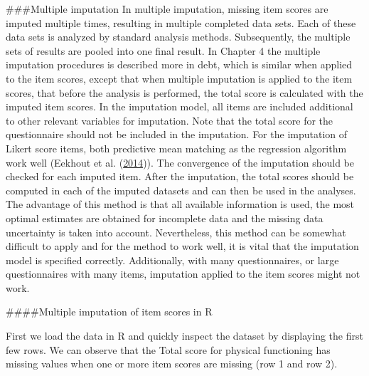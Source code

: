 \documentclass[
]{book}
\newenvironment{Shaded}{\begin{snugshade}}{\end{snugshade}}
\newcommand{\DecValTok}[1]{\textcolor[rgb]{0.00,0.00,0.81}{#1}}
\newcommand{\KeywordTok}[1]{\textcolor[rgb]{0.13,0.29,0.53}{\textbf{#1}}}
\newcommand{\NormalTok}[1]{#1}
\newcommand{\OperatorTok}[1]{\textcolor[rgb]{0.81,0.36,0.00}{\textbf{#1}}}
\newcommand{\OtherTok}[1]{\textcolor[rgb]{0.56,0.35,0.01}{#1}}
\newcommand{\StringTok}[1]{\textcolor[rgb]{0.31,0.60,0.02}{#1}}
\begin{document}
\#\#\#Multiple imputation In multiple imputation, missing item scores
are imputed multiple times, resulting in multiple completed data sets.
Each of these data sets is analyzed by standard analysis methods.
Subsequently, the multiple sets of results are pooled into one final
result. In Chapter 4 the multiple imputation procedures is described
more in debt, which is similar when applied to the item scores, except
that when multiple imputation is applied to the item scores, that before
the analysis is performed, the total score is calculated with the
imputed item scores. In the imputation model, all items are included
additional to other relevant variables for imputation. Note that the
total score for the questionnaire should not be included in the
imputation. For the imputation of Likert score items, both predictive
mean matching as the regression algorithm work well (Eekhout et al.
(\protect\hyperlink{ref-Eekhout2014}{2014})). The convergence of the
imputation should be checked for each imputed item. After the
imputation, the total scores should be computed in each of the imputed
datasets and can then be used in the analyses. The advantage of this
method is that all available information is used, the most optimal
estimates are obtained for incomplete data and the missing data
uncertainty is taken into account. Nevertheless, this method can be
somewhat difficult to apply and for the method to work well, it is vital
that the imputation model is specified correctly. Additionally, with
many questionnaires, or large questionnaires with many items, imputation
applied to the item scores might not work.

\#\#\#\#Multiple imputation of item scores in R

First we load the data in R and quickly inspect the dataset by
displaying the first few rows. We can observe that the Total score for
physical functioning has missing values when one or more item scores are
missing (row 1 and row 2).

\begin{Shaded}
\end{Shaded}
\end{document}
